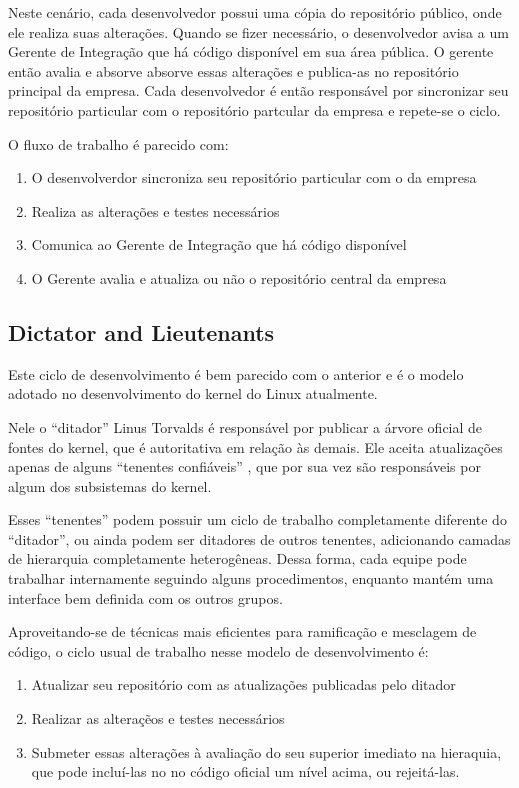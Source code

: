 Neste cenário, cada desenvolvedor possui uma cópia do repositório público, onde ele realiza suas alterações. Quando se fizer necessário, o desenvolvedor avisa a um Gerente de Integração que há código disponível em sua área pública. O gerente então avalia e absorve absorve essas alterações e publica-as no repositório principal da empresa. Cada desenvolvedor é então responsável por sincronizar seu repositório particular com o repositório partcular da empresa e repete-se o ciclo\cite{Chacon}.

O fluxo de trabalho é parecido com:

\begin{enumerate}
\item O desenvolverdor sincroniza seu repositório particular com o da empresa
\item Realiza as alterações e testes necessários
\item Comunica ao Gerente de Integração que há código disponível
\item O Gerente avalia e atualiza ou não o repositório central da empresa
\end{enumerate}


\subsection{Dictator and Lieutenants}

Este ciclo de desenvolvimento é bem parecido com o anterior e é o modelo adotado no desenvolvimento do kernel do Linux atualmente.

Nele o ``ditador'' Linus Torvalds é responsável por publicar a árvore oficial de fontes do kernel, que é autoritativa em relação às demais. Ele aceita atualizações apenas de alguns ``tenentes confiáveis'' \cite{Sullivan}, que por sua vez são responsáveis por algum dos subsistemas do kernel.

Esses ``tenentes'' podem possuir um ciclo de trabalho completamente diferente do ``ditador'', ou ainda podem ser ditadores de outros tenentes, adicionando camadas de hierarquia completamente heterogêneas. Dessa forma, cada equipe pode trabalhar internamente seguindo alguns procedimentos, enquanto mantém uma interface bem definida com os outros grupos.

Aproveitando-se de técnicas mais eficientes para ramificação e mesclagem de código, o ciclo usual de trabalho nesse modelo de desenvolvimento é:

\begin{enumerate}
\item Atualizar seu repositório com as atualizações publicadas pelo ditador
\item Realizar as alteraçẽos e testes necessários
\item Submeter essas alterações à avaliação do seu superior imediato na hieraquia, que pode incluí-las no no código oficial um nível acima, ou rejeitá-las.
\end{enumerate}

